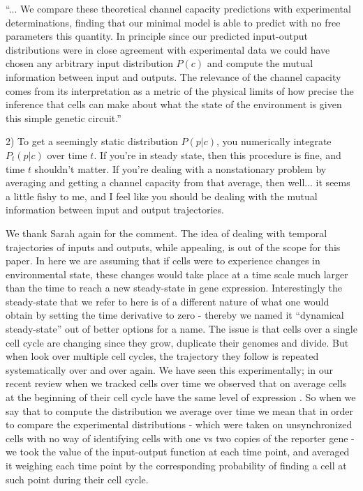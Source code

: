``... We compare these theoretical channel capacity predictions with
experimental determinations, finding that our minimal model is able to predict
with no free parameters this quantity. In principle since our predicted
input-output distributions were in close agreement with experimental data we
could have chosen any arbitrary input distribution $P(c)$ and compute the mutual
information between input and outputs. The relevance of the channel capacity
comes from its interpretation as a metric of the physical limits of how precise
the inference that cells can make about what the state of the environment is
given this simple genetic circuit.''

\begin{tcolorbox}
2)  To get a seemingly static distribution $P(p|c)$, you numerically integrate
$P_t(p|c)$ over time $t$.  If you're in steady state, then this procedure is
fine, and time $t$ shouldn't matter.  If you're dealing with a nonstationary
problem by averaging and getting a channel capacity from that average, then
well... it seems a little fishy to me, and I feel like you should be dealing
with the mutual information between input and output trajectories.
\end{tcolorbox}
We thank Sarah again for the comment. The idea of dealing with temporal
trajectories of inputs and outputs, while appealing, is out of the scope for
this paper. In here we are assuming that if cells were to experience changes
in environmental state, these changes would take place at a time scale much
larger than the time to reach a new steady-state in gene expression.
Interestingly the steady-state that we refer to here is of a different nature of
what one would obtain by setting the time derivative to zero - thereby we named
it ``dynamical steady-state'' out of better options for a name. The issue is
that cells over a single cell cycle are changing since they grow, duplicate
their genomes and divide. But when look over multiple cell cycles, the
trajectory they follow is repeated systematically over and over again. We have
seen this experimentally; in our recent review when we tracked cells over time
we observed that on average cells at the beginning of their cell cycle have the
same level of expression \cite{Phillips2019}. So when we say that to compute the
distribution we average over time we mean that in order to compare the
experimental distributions - which were taken on unsynchronized cells with no
way of identifying cells with one vs two copies of the reporter gene - we took
the value of the input-output function at each time point, and averaged it
weighing each time point by the corresponding probability of finding a cell at
such point during their cell cycle.


